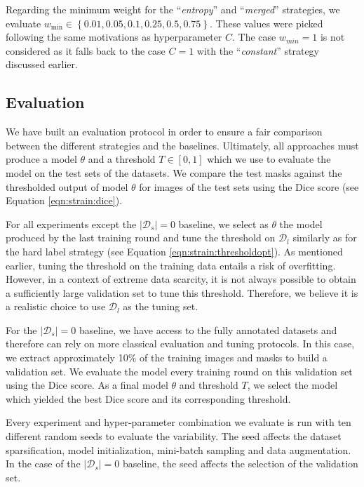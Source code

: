 Regarding the minimum weight for the ``\textit{entropy}'' and ``\textit{merged}'' strategies, we evaluate $w_{\text{min}} \in \left\{0.01, 0.05, 0.1, 0.25, 0.5, 0.75\right\}$. These values were picked following the same motivations as hyperparameter $C$. The case $w_{min} = 1$ is not considered as it falls back to the case $C = 1$ with the ``\textit{constant}'' strategy discussed earlier.

\subsection{Evaluation}
\label{ssec:strain:evaluation}

We have built an evaluation protocol in order to ensure a fair comparison between the different strategies and the baselines. Ultimately, all approaches must produce a model $\theta$ and a threshold $T \in [0, 1]$ which we use to evaluate the model on the test sets of the datasets. We compare the test masks against the thresholded output of model $\theta$ for images of the test sets using the Dice score (see Equation \ref{eqn:strain:dice}). 

For all experiments except the $|\mathcal{D}_s| = 0$ baseline, we select as $\theta$ the model produced by the last training round and tune the threshold on $\mathcal{D}_l$ similarly as for the hard label strategy (see Equation \ref{eqn:strain:thresholdopt}). As mentioned earlier, tuning the threshold on the training data entails a risk of overfitting. However, in a context of extreme data scarcity, it is not always possible to obtain a sufficiently large validation set to tune this threshold. Therefore, we believe it is a realistic choice to use $\mathcal{D}_l$ as the tuning set.  

For the $|\mathcal{D}_s| = 0$ baseline, we have access to the fully annotated datasets and therefore can rely on more classical evaluation and tuning protocols. In this case, we extract approximately 10\% of the training images and masks to build a validation set. We evaluate the model every training round on this validation set using the Dice score. As a final model $\theta$ and threshold $T$, we select the model which yielded the best Dice score and its corresponding threshold. 

Every experiment and hyper-parameter combination we evaluate is run with ten different random seeds to evaluate the variability. The seed affects the dataset sparsification, model initialization, mini-batch sampling and data augmentation. In the case of the $|\mathcal{D}_s| = 0$ baseline, the seed affects the selection of the validation set. 

